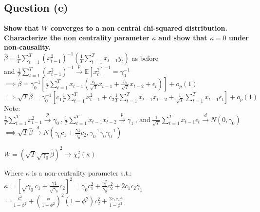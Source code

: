 \documentclass[11pt]{article}
\theoremstyle{definition}
\def\inprob{\stackrel{p}{\rightarrow}}
\def\indist{\stackrel{d}{\rightarrow}}
\begin{document}
\subsection{Question (e)}
\textbf{Show that $W$ converges to a non central chi-squared distribution.  Characterize the non centrality parameter $\kappa$ and show that $\kappa=0$ under non-causality.} \\

$\hat{\beta}  = \frac{1}{T}\sum_{t=1}^{T}(x_{t-1}^{2})^{-1}(\frac{1}{T}\sum_{t=1}^{T}x_{t-1}y_{t})$ as before \\

and $ \frac{1}{T}\sum_{t=1}^{T}(x_{t-1}^{2})^{-1} \inprob \mathbb{E}\left[x_{t}^{2}\right]^{-1}=\gamma_{0}^{-1}$ \\

$\implies \hat{\beta}= \gamma_{0}^{-1}\left[\frac{1}{T}\sum_{t=1}^{T}x_{t-1}\left(\frac{c_{1}}{\sqrt{T}}x_{t-1}+\frac{c_{2}}{\sqrt{T}}x_{t-2} +\epsilon_{t}\right)\right]+o_{p}(1)$ \\

$\implies \sqrt{T}\hat{\beta}= \gamma_{0}^{-1}\left[c_{1}\frac{1}{T}\sum_{t=1}^{T}x_{t-1}^{2}+c_{2}\frac{1}{T}\sum_{t=1}^{T}x_{t-1}x_{t-2}+\frac{1}{\sqrt{T}}\sum_{t=1}^{T}x_{t-1}\epsilon_{t}\right]+o_{p}(1)$ \\

Note: $\frac{1}{T}\sum_{t=1}^{T}x_{t-1}^{2} \inprob \gamma_{0} \ \text{,} \  \frac{1}{T}\sum_{t=1}^{T}x_{t-1}x_{t-2} \inprob \gamma_{1} \ \text{, and} \ \frac{1}{\sqrt{T}}\sum_{t=1}^{T}x_{t-1}\epsilon_{t}\indist N(0,\gamma_{0})$ \\

$\implies \sqrt{T}\hat{\beta} \indist N\left(\gamma_{0}c_{1}+\frac{\gamma{1}}{\gamma_{0}}c_{2}, \gamma_{0}^{-1}\gamma_{0}\gamma_{0}^{-1}\right)$

$W=\left(\sqrt{T}\sqrt{\gamma_{0}}\hat{\beta}\right)^2 \rightarrow \chi_{r}^{2}(\kappa)$

Where $\kappa$ is a non-centrality parameter s.t.: \\

$\kappa = \left[\sqrt{\gamma_{0}}c_{1}+\frac{\gamma{1}}{\sqrt{\gamma_{0}}}c_{2}\right]^{2}=\gamma_{0}c_{1}^{2}+\frac{\gamma_{1}^{2}}{\gamma_{0}}c_{2}^{2}+2c_{1}c_{2}\gamma_{1}$ \\

\hspace{3mm}$=\frac{c_{1}^{2}}{1-\phi^{2}}+\left(\frac{\phi}{1-\phi^{2}}\right)^{2}(1-\phi^{2})c_{2}^{2}+\frac{2c_{1}c_{2}\phi}{1-\phi^{2}}$ \\
\end{document}
